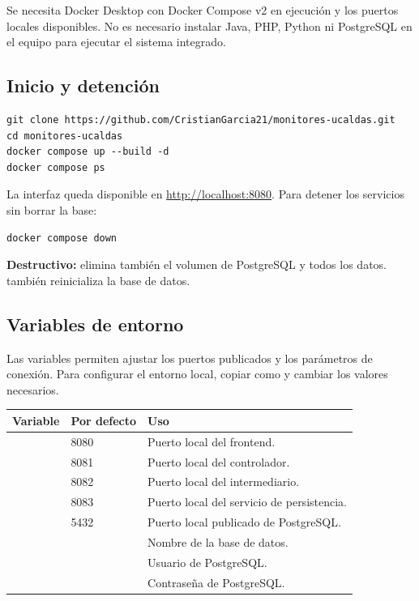 Se necesita Docker Desktop con Docker Compose v2 en ejecución y los puertos locales disponibles. No es necesario instalar Java, PHP, Python ni PostgreSQL en el equipo para ejecutar el sistema integrado.

\subsection{Inicio y detención}

\begin{lstlisting}
git clone https://github.com/CristianGarcia21/monitores-ucaldas.git
cd monitores-ucaldas
docker compose up --build -d
docker compose ps
\end{lstlisting}

La interfaz queda disponible en \url{http://localhost:8080}. Para detener los servicios sin borrar la base:

\begin{lstlisting}
docker compose down
\end{lstlisting}

\textbf{Destructivo:}  elimina también el volumen de PostgreSQL y todos los datos.  también reinicializa la base de datos.

\subsection{Variables de entorno}

Las variables permiten ajustar los puertos publicados y los parámetros de conexión. Para configurar el entorno local, copiar  como  y cambiar los valores necesarios.

\begin{tabularx}{\textwidth}{p{}p{}Y}
\toprule
\textbf{Variable} & \textbf{Por defecto} & \textbf{Uso} \\
\midrule
{} & 8080 & Puerto local del frontend. \\
 & 8081 & Puerto local del controlador. \\
 & 8082 & Puerto local del intermediario. \\
 & 8083 & Puerto local del servicio de persistencia. \\
 & 5432 & Puerto local publicado de PostgreSQL. \\
 &  & Nombre de la base de datos. \\
 &  & Usuario de PostgreSQL. \\
 &  & Contraseña de PostgreSQL. \\
\bottomrule
\end{tabularx}

